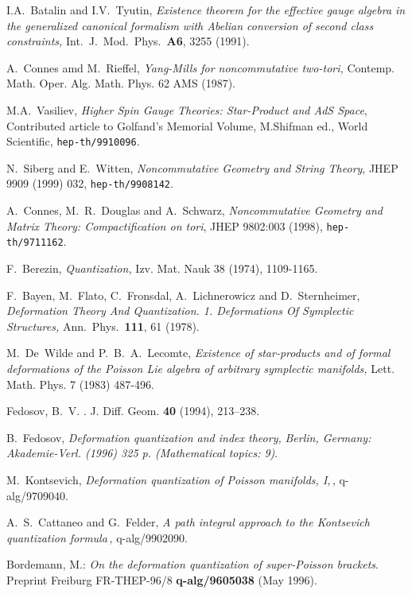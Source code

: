 \documentclass[a4paper,11pt,oneside]{amsart}
\theoremstyle{plain}
\numberwithin{equation}{section} %
\numberwithin{figure}{section} %
\begin{document}
\begin{thebibliography}{33}
\bibitem{[BT]} I.A.~Batalin and I.V.~Tyutin, {\em
Existence theorem for the effective gauge algebra in the generalized
        canonical formalism with Abelian conversion of second class
        constraints,} Int.\ J.\ Mod.\ Phys.\ {\bf A6}, 3255 (1991).

\bibitem{[Connes]} A.~Connes amd M.~Rieffel, {\em Yang-Mills for
noncommutative two-tori,} Contemp. Math. Oper. Alg. Math. Phys. 62
AMS (1987).



\bibitem{[Vasiliev]} M.A.~Vasiliev, {\em Higher Spin Gauge Theories:
Star-Product and AdS Space}, Contributed article to Golfand's
Memorial Volume, M.Shifman ed., World Scientific, {\tt hep-th/9910096}.


\bibitem{[SW]} N.~Siberg and E.~Witten, {\em Noncommutative
Geometry and String Theory}, JHEP 9909 (1999) 032,
{\tt hep-th/9908142}.


\bibitem{[CDS]}  A.~Connes, M.~R.~Douglas and A.~Schwarz,
{\em Noncommutative Geometry and Matrix Theory: Compactification
on tori}, JHEP 9802:003 (1998), {\tt hep-th/9711162}.

\bibitem{[Berezin]} F.~Berezin, {\em Quantization,}
Izv. Mat. Nauk 38 (1974), 1109-1165.


\bibitem{[BFFLS]}
F.~Bayen, M.~Flato, C.~Fronsdal, A.~Lichnerowicz and D.~Sternheimer,
{\em Deformation Theory And Quantization. 1. Deformations Of Symplectic
Structures,}
Ann.\ Phys.\ {\bf 111}, 61 (1978).

\bibitem{[DWL]}
M.~De~Wilde and P.~B.~A.~Lecomte,
{\em Existence of star-products
and of formal deformations of the Poisson Lie algebra of arbitrary
symplectic manifolds,}
 Lett. Math. Phys. 7 (1983) 487-496.

Fedosov, B.~V. .
\newblock J. Diff. Geom.  {\bf 40} (1994), 213--238.

 B.~Fedosov,
{\em Deformation quantization and index theory,}
{\it  Berlin, Germany: Akademie-Verl. (1996) 325 p. (Mathematical
  topics: 9)}.

\bibitem{[Kontsevich]}
M.~Kontsevich,
{\em Deformation quantization of Poisson manifolds, I,}\,,
q-alg/9709040.

\bibitem{[Felder]} A.~S.~Cattaneo and G.~Felder,
{\em A path integral approach to the Kontsevich quantization
formula\,,} q-alg/9902090.

 { Bordemann, M.: }
\newblock
{\em On the deformation quantization of
  super-Poisson brackets}.
\newblock Preprint Freiburg FR-THEP-96/8  {\bf q-alg/9605038} (May
1996).



\end{thebibliography}
\end{document}
